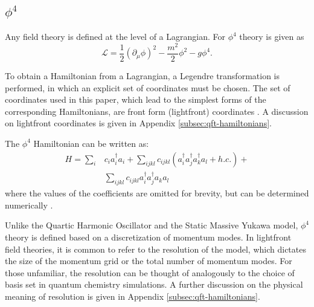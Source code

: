 \subsection{$\phi^4$}
\label{sec:phi4_results}

Any field theory is defined at the level of a Lagrangian.
For $\phi^4$ theory is given as
\begin{equation}
    \mathcal{L} = \frac12 \left(\partial_\mu \phi \right)^2 - \frac{m^2}{2}\phi^2 - g\phi^4.
\end{equation}

To obtain a Hamiltonian from a Lagrangian, a Legendre transformation  is performed, in which an explicit set of coordinates must be chosen. 
The set of coordinates used in this paper, which lead to the simplest forms of the corresponding Hamiltonians, are front form (lightfront) coordinates \cite{Dirac1949}.
A discussion on lightfront coordinates is given in Appendix \ref{subsec:qft-hamiltonians}.

The $\phi^4$ Hamiltonian can be written as:
\begin{align}
    H = \sum_i &c_i a_i^\dagger a_i + \sum_{ijkl}c_{ijkl} \left(a_i^\dagger a_j^\dagger a_k^\dagger a_l + h.c. \right) + \nonumber\\
    &\sum_{ijkl}c_{ijkl}a_i^\dagger a_j^\dagger a_k a_l
\end{align}
where the values of the coefficients are omitted for brevity, but can be determined numerically .

Unlike the Quartic Harmonic Oscillator and the Static Massive Yukawa model, $\phi^4$ theory is defined based on a discretization of momentum modes.
In lightfront field theories, it is common to refer to the resolution of the model, which dictates the size of the momentum grid or the total number of momentum modes.
For those unfamiliar, the resolution can be thought of analogously to the choice of basis set in quantum chemistry simulations.
A further discussion on the physical meaning of resolution is given in Appendix \ref{subsec:qft-hamiltonians}.

